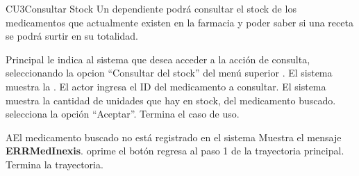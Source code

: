 
% 



	\begin{UseCase}{CU3}{Consultar Stock}{
		Un dependiente podrá consultar el stock de los medicamentos que actualmente existen en la farmacia y poder saber si una receta se podrá surtir en su totalidad.
	}
	\end{UseCase}

	\begin{UCtrayectoria}{Principal}
		\UCpaso[\UCactor] le indica al sistema que desea acceder a la acci\'on de consulta, seleccionando la opcion "`Consultar del stock"' del men\'u superior .
		\UCpaso El sistema muestra la \label{IUConsulta} .
		\UCpaso[\UCactor] El actor ingresa el ID del medicamento a consultar. 
		\UCpaso El sistema muestra la cantidad de unidades que hay en stock, del medicamento buscado. 
		\UCpaso [\UCactor] selecciona la opción "`Aceptar"'. 
		\UCpaso[] Termina el caso de uso.
	\end{UCtrayectoria}
		
		\begin{UCtrayectoriaA}{A}{El medicamento buscado no est\'a registrado en el sistema}
			\UCpaso Muestra el mensaje {\bf ERRMedInexis}.
			\UCpaso[\UCactor] oprime el botón 
			\UCpaso[\UCactor] regresa al paso 1 de la trayectoria principal.  
			\UCpaso[] Termina la trayectoria.
		\end{UCtrayectoriaA}
		
		
		
